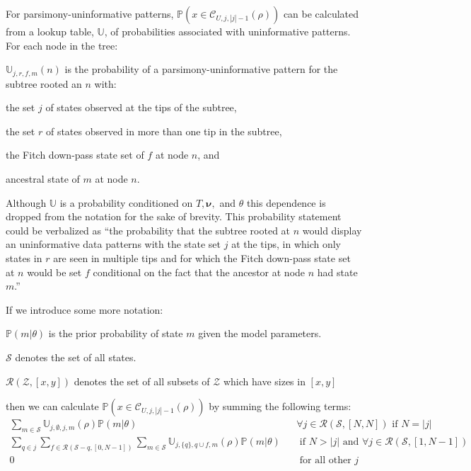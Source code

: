 \documentclass[11pt]{article}
\newcommand{\treeRoot}{\ensuremath{\rho}\xspace}
\newcommand{\uninform}{\ensuremath{U}\xspace}
\newcommand{\numLeavesTotal}{\ensuremath{N}\xspace}
\newcommand{\allStates}{\ensuremath{\mathcal S}\xspace}
\newcommand{\edgeLengths}{\ensuremath{\bm \nu}\xspace}
\newcommand{\patProbSym}{\ensuremath{\mathbb P}\xspace}
\renewcommand{\Pr}{\patProbSym}
\newcommand{\patClassSym}{\ensuremath{\mathcal C}\xspace}
\newcommand{\patClass}[3]{\ensuremath{\patClassSym_{#1,#2,#3}}\xspace}
\newcommand{\probUninformPatClassSym}{\ensuremath{\mathbb U}\xspace}
\newcommand{\probUninformPatClass}[5]{\ensuremath{\probUninformPatClassSym_{#1,#2,#3,#4}\left(#5\right)}\xspace}
\newcommand{\subsetsOfSizeSet}[3]{\ensuremath{\mathcal R}\left(#1,\left[#2,#3\right]\right)\xspace}
\begin{document}
For parsimony-uninformative patterns, $\Pr(x\in\patClass{\uninform}{j}{|j|-1}(\treeRoot))$ can be calculated from a lookup table, $\probUninformPatClassSym$, of probabilities associated with uninformative patterns.
For each node in the tree:
\begin{compactitem}
	\item $\probUninformPatClass{j}{r}{f}{m}{n}$ is the probability of a parsimony-uninformative pattern for the subtree rooted an $n$ with:
		\begin{compactitem}
			\item the set $j$ of states observed at the tips of the subtree,
			\item the set $r$ of states observed in more than one tip in the subtree,
			\item the Fitch down-pass state set of $f$ at node $n$, and
			\item ancestral state of $m$ at node $n$.
		\end{compactitem}
		Although \probUninformPatClassSym is a probability conditioned on $T, \edgeLengths,$ and $\theta$ this dependence is dropped from the notation for the sake of brevity.
		This probability statement could be verbalized as ``the probability that the subtree rooted at $n$ would display an uninformative data patterns with the state set $j$ at the tips, in which only states in $r$ are seen in multiple tips and for which the Fitch down-pass state set at $n$ would be set $f$ conditional on the fact that the ancestor at node $n$ had state $m$.''
\end{compactitem}
If we introduce some more notation:
\begin{compactitem}
	\item $\Pr(m|\theta)$ is the prior probability of state $m$ given the model parameters.
	\item \allStates denotes the set of all states.
	\item $\subsetsOfSizeSet{\mathcal{Z}}{x}{y}$ denotes the set of all subsets of ${\mathcal Z}$ which have sizes in $[x,y]$
\end{compactitem}
then we can calculate $\Pr(x\in\patClass{\uninform}{j}{|j|-1}(\treeRoot))$ by summing the following terms:
\begin{eqnarray}
   \sum_{m\in\allStates}\probUninformPatClass{j}{\emptyset}{j}{m}{\treeRoot}\Pr(m|\theta) && 	\forall j \in  \subsetsOfSizeSet{\allStates}{\numLeavesTotal}{\numLeavesTotal} \mbox{ if } N = |j|  \label{noRepeatedStates}\\
  \sum_{q\in j}\sum_{f\in\subsetsOfSizeSet{\allStates-q}{0}{\numLeavesTotal-1}}\sum_{m\in\allStates}\probUninformPatClass{j}{\{q\}}{q\cup f}{m}{\treeRoot}\Pr(m|\theta)  &&  \mbox{ if } N > |j| \mbox{ and }\forall j \in  \subsetsOfSizeSet{\allStates}{1}{\numLeavesTotal-1}\label{oneRepeatedState}\\
  0 && \mbox{ for all other } j \mbox{}
\end{eqnarray}
\end{document}
